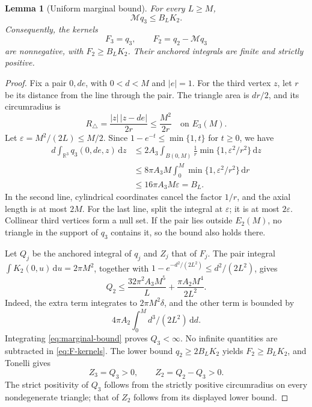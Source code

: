 \documentclass[11pt,a4paper]{article}
\numberwithin{equation}{section}
\newtheorem{lemma}[theorem]{Lemma}
\theoremstyle{definition}
\theoremstyle{remark}
\newcommand{\R}{\mathbb R}
\newcommand{\dd}{\,\mathrm d}
\newcommand{\Mop}{\mathcal M}
\begin{document}
\begin{lemma}[Uniform marginal bound]\label{lem:deficit}
For every $L\geq M$,
\begin{equation}
 \Mop q_3\leq B_LK_2.
 \label{eq:marginal-bound}
\end{equation}
Consequently, the kernels
\begin{equation}
 F_3=q_3,\qquad F_2=q_2-\Mop q_3
 \label{eq:F-kernels}
\end{equation}
are nonnegative, with $F_2\geq B_LK_2$. Their anchored integrals are
finite and strictly positive.
\end{lemma}
\begin{proof}
Fix a pair $0,de$, with $0<d<M$ and $|e|=1$. For the third vertex $z$,
let $r$ be its distance from the line through the pair. The triangle area
is $dr/2$, and its circumradius is
\begin{equation}
 R_\triangle=\frac{|z|\,|z-de|}{2r}\leq\frac{M^2}{2r}
 \quad\text{on }E_3(M).
 \label{eq:circumradius-bound}
\end{equation}
Let $\varepsilon=M^2/(2L)\leq M/2$. Since
$1-e^{-t}\leq\min\{1,t\}$ for $t\geq0$, we have
\begin{align*}
 d\int_{\R^3}q_3(0,de,z)\dd z
 &\leq2A_3\int_{B(0,M)}\frac1r
                    \min\{1,\varepsilon^2/r^2\}\dd z\\
 &\leq8\pi A_3M\int_0^M\min\{1,\varepsilon^2/r^2\}\dd r\\
 &\leq16\pi A_3M\varepsilon=B_L.
\end{align*}
In the second line, cylindrical coordinates cancel the factor $1/r$,
and the axial length is at most $2M$. For the last line, split the
integral at $\varepsilon$; it is at most $2\varepsilon$. Collinear third
vertices form a null set. If the pair lies outside $E_2(M)$, no triangle
in the support of $q_3$ contains it, so the bound also holds there.

Let $Q_j$ be the anchored integral of $q_j$ and $Z_j$ that of $F_j$.
The pair integral $\int K_2(0,u)\dd u=2\pi M^2$, together with
$1-e^{-d^2/(2L^2)}\leq d^2/(2L^2)$, gives
\begin{equation}
 Q_2\leq\frac{32\pi^2A_3M^5}{L}
              +\frac{\pi A_2M^4}{2L^2}.
 \label{eq:Q2-bound}
\end{equation}
Indeed, the extra term integrates to $2\pi M^2\delta$, and the other
term is bounded by
\[
 4\pi A_2\int_0^M d^3/(2L^2)\dd d.
\]
Integrating \eqref{eq:marginal-bound} proves $Q_3<\infty$.
No infinite quantities are subtracted in \eqref{eq:F-kernels}.
The lower bound $q_2\geq2B_LK_2$ yields
$F_2\geq B_LK_2$, and Tonelli gives
\begin{equation}
 Z_3=Q_3>0,\qquad Z_2=Q_2-Q_3>0.
 \label{eq:ZQ}
\end{equation}
The strict positivity of $Q_3$ follows from the strictly positive
circumradius on every nondegenerate triangle; that of $Z_2$ follows from
its displayed lower bound.
\end{proof}
\end{document}
